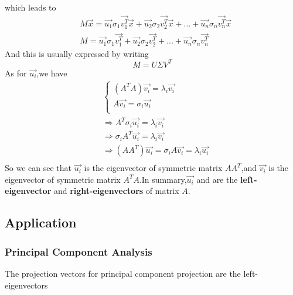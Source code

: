 which leads to
\begin{align}
& M\vec{x} = \vec{u_1}\sigma_1\vec{v_1^T}\vec{x}+\vec{u_2}\sigma_2\vec{v_2^T}\vec{x}+...+\vec{u_n}\sigma_n\vec{v_n^T}\vec{x} \\
&  M = \vec{u_1}\sigma_1\vec{v_1^T}+\vec{u_2}\sigma_2\vec{v_2^T}+...+\vec{u_n}\sigma_n\vec{v_n^T}
\end{align}
And this is usually expressed by writing 
\begin{equation}
M = U\Sigma V^T
\end{equation}
As for $\vec{u_i}$,we have
\begin{align*}
&\begin{cases}
(A^TA)\vec{v_i} = \lambda_i\vec{v_i}	\\
A\vec{v_i}    = \sigma_i\vec{u_i}	\\
\end{cases} \\
&\Rightarrow A^T\sigma_i\vec{u_i} = \lambda_i\vec{v_i} \\
&\Rightarrow \sigma_iA^T\vec{u_i} = \lambda_i\vec{v_i}\\
&\Rightarrow (AA^T)\vec{u_i}=\sigma_iA\vec{v_i} = \lambda_i\vec{u_i}\\
\end{align*}
So we can see that $\vec{u_i}$ is the eigenvector of symmetric matrix $AA^T$,and $\vec{v_i}$ is the eigenvector of symmetric matrix $A^TA$.In summary,$\vec{u_i}$ and  are the \textbf{left-eigenvector} and \textbf{right-eigenvectors} of matrix $A$.
\subsection{Application}
\subsubsection{Principal Component Analysis}
The projection vectors for principal component projection are the left-eigenvectors